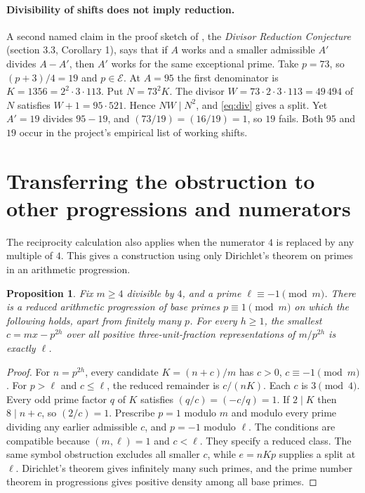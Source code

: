 \documentclass[a4paper,11pt]{article}
\newtheorem{proposition}[theorem]{Proposition}
\theoremstyle{definition}\newtheorem{question}[theorem]{Question}
\newcommand{\E}{\mathcal E}
\begin{document}
\paragraph{Divisibility of shifts does not imply reduction.}
A second named claim in the proof sketch of \cite{tier}, the \emph{Divisor Reduction Conjecture} (section 3.3, Corollary 1), says that if $A$ works and a smaller admissible $A'$ divides $A-A'$, then $A'$ works for the same exceptional prime. Take $p=73$, so $(p+3)/4=19$ and $p\in\E$. At $A=95$ the first denominator is $K=1356=2^2\cdot3\cdot113$. Put $N=73^2K$. The divisor $W=73\cdot2\cdot3\cdot113=49\,494$ of $N$ satisfies $W+1=95\cdot521$. Hence $NW\mid N^2$, and \eqref{eq:div} gives a split. Yet $A'=19$ divides $95-19$, and $(73/19)=(16/19)=1$, so $19$ fails. Both $95$ and $19$ occur in the project's empirical list of working shifts.


\section{Transferring the obstruction to other progressions and numerators}
The reciprocity calculation also applies when the numerator $4$ is replaced by any multiple of $4$. This gives a construction using only Dirichlet's theorem on primes in an arithmetic progression.
\begin{proposition}\label{prop:mult}
Fix $m\ge4$ divisible by $4$, and a prime $\ell\equiv-1\pmod m$. There is a reduced arithmetic progression of base primes $p\equiv1\pmod m$ on which the following holds, apart from finitely many $p$. For every $h\ge1$, the smallest $c=mx-p^{2h}$ over all positive three-unit-fraction representations of $m/p^{2h}$ is exactly $\ell$.
\end{proposition}
\begin{proof}
For $n=p^{2h}$, every candidate $K=(n+c)/m$ has $c>0$, $c\equiv-1\pmod m$. For $p>\ell$ and $c\le\ell$, the reduced remainder is $c/(nK)$. Each $c$ is $3\pmod4$. Every odd prime factor $q$ of $K$ satisfies $(q/c)=(-c/q)=1$. If $2\mid K$ then $8\mid n+c$, so $(2/c)=1$. Prescribe $p=1$ modulo $m$ and modulo every prime dividing any earlier admissible $c$, and $p=-1$ modulo $\ell$. The conditions are compatible because $(m,\ell)=1$ and $c<\ell$. They specify a reduced class. The same symbol obstruction excludes all smaller $c$, while $e=nKp$ supplies a split at $\ell$. Dirichlet's theorem gives infinitely many such primes, and the prime number theorem in progressions gives positive density among all base primes.
\end{proof}
\end{document}
